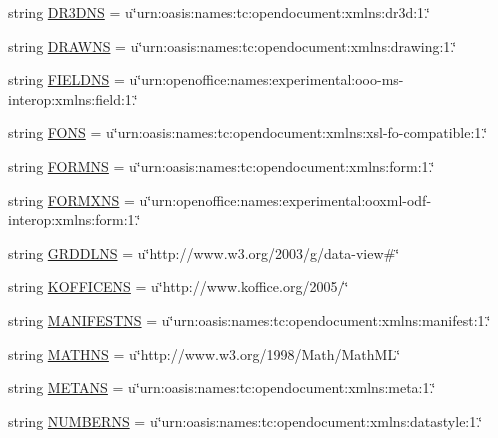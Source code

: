 \begin{DoxyCompactItemize}
string \hyperlink{namespaceodf_1_1namespaces_a860843eba0261d640a6cb3969d284dec}{D\+R3\+D\+N\+S} = u\char`\"{}urn\+:oasis\+:names\+:tc\+:opendocument\+:xmlns\+:dr3d\+:1.\char`\"{}
\item 
string \hyperlink{namespaceodf_1_1namespaces_a1c3d3371868027499fa692523a329771}{D\+R\+A\+W\+N\+S} = u\char`\"{}urn\+:oasis\+:names\+:tc\+:opendocument\+:xmlns\+:drawing\+:1.\char`\"{}
\item 
string \hyperlink{namespaceodf_1_1namespaces_a5f880ea23cc37a5c2dd018add208fc9a}{F\+I\+E\+L\+D\+N\+S} = u\char`\"{}urn\+:openoffice\+:names\+:experimental\+:ooo-\/ms-\/interop\+:xmlns\+:field\+:1.\char`\"{}
\item 
string \hyperlink{namespaceodf_1_1namespaces_a2e62823a20c59b5a063f191cb502a40f}{F\+O\+N\+S} = u\char`\"{}urn\+:oasis\+:names\+:tc\+:opendocument\+:xmlns\+:xsl-\/fo-\/compatible\+:1.\char`\"{}
\item 
string \hyperlink{namespaceodf_1_1namespaces_a82eec0bd42700b76e98478d5d810c8e6}{F\+O\+R\+M\+N\+S} = u\char`\"{}urn\+:oasis\+:names\+:tc\+:opendocument\+:xmlns\+:form\+:1.\char`\"{}
\item 
string \hyperlink{namespaceodf_1_1namespaces_acf394b4625e52a7730971ed6e8b94a31}{F\+O\+R\+M\+X\+N\+S} = u\char`\"{}urn\+:openoffice\+:names\+:experimental\+:ooxml-\/odf-\/interop\+:xmlns\+:form\+:1.\char`\"{}
\item 
string \hyperlink{namespaceodf_1_1namespaces_a22eeeab741b4d282e96b17532f3a0916}{G\+R\+D\+D\+L\+N\+S} = u\char`\"{}http\+://www.\+w3.\+org/2003/g/data-\/view\#\char`\"{}
\item 
string \hyperlink{namespaceodf_1_1namespaces_a063735def0cfb8622b678f065f5edc31}{K\+O\+F\+F\+I\+C\+E\+N\+S} = u\char`\"{}http\+://www.\+koffice.\+org/2005/\char`\"{}
\item 
string \hyperlink{namespaceodf_1_1namespaces_a8b9e758fdd0351722b2994c1348b6f30}{M\+A\+N\+I\+F\+E\+S\+T\+N\+S} = u\char`\"{}urn\+:oasis\+:names\+:tc\+:opendocument\+:xmlns\+:manifest\+:1.\char`\"{}
\item 
string \hyperlink{namespaceodf_1_1namespaces_a416dcbc248ffed1b51a741c570e00306}{M\+A\+T\+H\+N\+S} = u\char`\"{}http\+://www.\+w3.\+org/1998/Math/Math\+M\+L\char`\"{}
\item 
string \hyperlink{namespaceodf_1_1namespaces_a223c0beb389117b2a2549bdb1173f184}{M\+E\+T\+A\+N\+S} = u\char`\"{}urn\+:oasis\+:names\+:tc\+:opendocument\+:xmlns\+:meta\+:1.\char`\"{}
\item 
string \hyperlink{namespaceodf_1_1namespaces_a4555107194c538783a780aebf6137d88}{N\+U\+M\+B\+E\+R\+N\+S} = u\char`\"{}urn\+:oasis\+:names\+:tc\+:opendocument\+:xmlns\+:datastyle\+:1.\char`\"{}

\end{DoxyCompactItemize}
